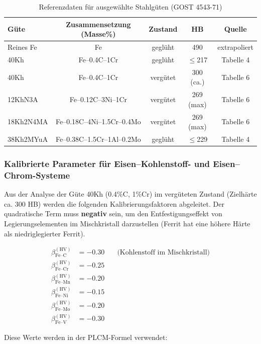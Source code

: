 \documentclass[12pt,a4paper]{article}
\begin{document}
	\begin{table}[htbp]
		\centering
		\caption{Referenzdaten für ausgewählte Stahlgüten (GOST 4543-71)}
		\label{tab:steel_gost4543}
		\begin{tabular}{lcccc}
			\toprule
			\textbf{Güte} & \textbf{Zusammensetzung (Masse\%)} & \textbf{Zustand} & \textbf{HB} & \textbf{Quelle} \\
			\midrule
			Reines Fe & Fe & geglüht & 490 & extrapoliert \\
			40Kh & Fe–0.4C–1Cr & geglüht & $\le$217 & Tabelle 4 \\
			40Kh & Fe–0.4C–1Cr & vergütet & 300 (ca.) & Tabelle 6 \\
			12KhN3A & Fe–0.12C–3Ni–1Cr & vergütet & 269 (max) & Tabelle 6 \\
			18Kh2N4MA & Fe–0.18C–4Ni–1.5Cr–0.4Mo & vergütet & 269 (max) & Tabelle 6 \\
			38Kh2MYuA & Fe–0.38C–1.5Cr–1Al–0.2Mo & geglüht & $\le$229 & Tabelle 4 \\
			\bottomrule
		\end{tabular}
	\end{table}
	
	\subsubsection{Kalibrierte Parameter für Eisen–Kohlenstoff- und Eisen–Chrom-Systeme}
	
	Aus der Analyse der Güte 40Kh (0.4\%C, 1\%Cr) im vergüteten Zustand (Zielhärte ca. 300 HB) werden die folgenden Kalibrierungsfaktoren abgeleitet. Der quadratische Term muss \textbf{negativ} sein, um den Entfestigungseffekt von Legierungselementen im Mischkristall darzustellen (Ferrit hat eine höhere Härte als niedriglegierter Ferrit).
	
	\[
	\begin{aligned}
		\beta_{\text{Fe–C}}^{(\text{HV})} &= -0.30 \quad &\text{(Kohlenstoff im Mischkristall)} \\
		\beta_{\text{Fe–Cr}}^{(\text{HV})} &= -0.25 \\
		\beta_{\text{Fe–Mn}}^{(\text{HV})} &= -0.20 \\
		\beta_{\text{Fe–Ni}}^{(\text{HV})} &= -0.15 \\
		\beta_{\text{Fe–Mo}}^{(\text{HV})} &= -0.20 \\
		\beta_{\text{Fe–V}}^{(\text{HV})} &= -0.30
	\end{aligned}
	\]
	
	Diese Werte werden in der PLCM-Formel verwendet:
	
\end{document}
